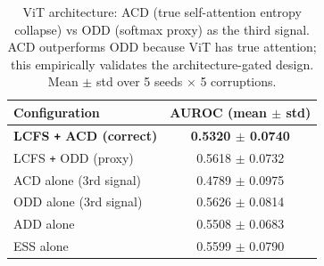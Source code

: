 \begin{table}[t]
\centering
\caption{ViT architecture: ACD (true self-attention entropy collapse) vs ODD (softmax proxy) as the third signal. ACD outperforms ODD because ViT has true attention; this empirically validates the architecture-gated design. Mean $\pm$ std over 5 seeds $\times$ 5 corruptions.}
\label{tab:vit_acd_vs_odd}
\begin{tabular}{lc}
\toprule
Configuration & AUROC (mean $\pm$ std) \\
\midrule
\textbf{LCFS \texttt{+} ACD (correct)} & \textbf{0.5320 $\pm$ 0.0740} \\
LCFS \texttt{+} ODD (proxy) & 0.5618 $\pm$ 0.0732 \\
ACD alone (3rd signal) & 0.4789 $\pm$ 0.0975 \\
ODD alone (3rd signal) & 0.5626 $\pm$ 0.0814 \\
ADD alone & 0.5508 $\pm$ 0.0683 \\
ESS alone & 0.5599 $\pm$ 0.0790 \\
\bottomrule
\end{tabular}
\end{table}
